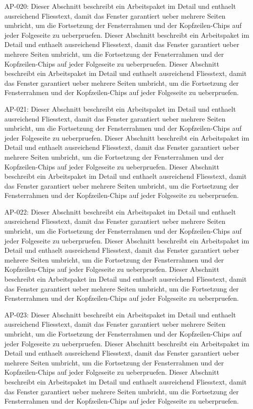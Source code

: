 \documentclass[type=report,theme=dark,language=de]{semio}
\begin{document}
\begin{Table}[title=Lange Tabelle]
AP-020: Dieser Abschnitt beschreibt ein Arbeitspaket im Detail und enthaelt ausreichend Fliesstext, damit das Fenster garantiert ueber mehrere Seiten umbricht, um die Fortsetzung der Fensterrahmen und der Kopfzeilen-Chips auf jeder Folgeseite zu ueberpruefen. Dieser Abschnitt beschreibt ein Arbeitspaket im Detail und enthaelt ausreichend Fliesstext, damit das Fenster garantiert ueber mehrere Seiten umbricht, um die Fortsetzung der Fensterrahmen und der Kopfzeilen-Chips auf jeder Folgeseite zu ueberpruefen. Dieser Abschnitt beschreibt ein Arbeitspaket im Detail und enthaelt ausreichend Fliesstext, damit das Fenster garantiert ueber mehrere Seiten umbricht, um die Fortsetzung der Fensterrahmen und der Kopfzeilen-Chips auf jeder Folgeseite zu ueberpruefen. 

AP-021: Dieser Abschnitt beschreibt ein Arbeitspaket im Detail und enthaelt ausreichend Fliesstext, damit das Fenster garantiert ueber mehrere Seiten umbricht, um die Fortsetzung der Fensterrahmen und der Kopfzeilen-Chips auf jeder Folgeseite zu ueberpruefen. Dieser Abschnitt beschreibt ein Arbeitspaket im Detail und enthaelt ausreichend Fliesstext, damit das Fenster garantiert ueber mehrere Seiten umbricht, um die Fortsetzung der Fensterrahmen und der Kopfzeilen-Chips auf jeder Folgeseite zu ueberpruefen. Dieser Abschnitt beschreibt ein Arbeitspaket im Detail und enthaelt ausreichend Fliesstext, damit das Fenster garantiert ueber mehrere Seiten umbricht, um die Fortsetzung der Fensterrahmen und der Kopfzeilen-Chips auf jeder Folgeseite zu ueberpruefen. 

AP-022: Dieser Abschnitt beschreibt ein Arbeitspaket im Detail und enthaelt ausreichend Fliesstext, damit das Fenster garantiert ueber mehrere Seiten umbricht, um die Fortsetzung der Fensterrahmen und der Kopfzeilen-Chips auf jeder Folgeseite zu ueberpruefen. Dieser Abschnitt beschreibt ein Arbeitspaket im Detail und enthaelt ausreichend Fliesstext, damit das Fenster garantiert ueber mehrere Seiten umbricht, um die Fortsetzung der Fensterrahmen und der Kopfzeilen-Chips auf jeder Folgeseite zu ueberpruefen. Dieser Abschnitt beschreibt ein Arbeitspaket im Detail und enthaelt ausreichend Fliesstext, damit das Fenster garantiert ueber mehrere Seiten umbricht, um die Fortsetzung der Fensterrahmen und der Kopfzeilen-Chips auf jeder Folgeseite zu ueberpruefen. 

AP-023: Dieser Abschnitt beschreibt ein Arbeitspaket im Detail und enthaelt ausreichend Fliesstext, damit das Fenster garantiert ueber mehrere Seiten umbricht, um die Fortsetzung der Fensterrahmen und der Kopfzeilen-Chips auf jeder Folgeseite zu ueberpruefen. Dieser Abschnitt beschreibt ein Arbeitspaket im Detail und enthaelt ausreichend Fliesstext, damit das Fenster garantiert ueber mehrere Seiten umbricht, um die Fortsetzung der Fensterrahmen und der Kopfzeilen-Chips auf jeder Folgeseite zu ueberpruefen. Dieser Abschnitt beschreibt ein Arbeitspaket im Detail und enthaelt ausreichend Fliesstext, damit das Fenster garantiert ueber mehrere Seiten umbricht, um die Fortsetzung der Fensterrahmen und der Kopfzeilen-Chips auf jeder Folgeseite zu ueberpruefen. 


\end{Table}
\end{document}
